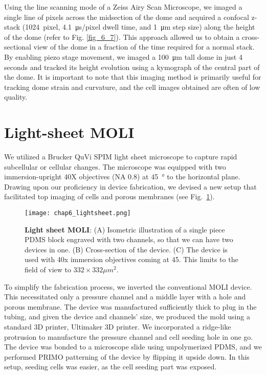 Using the line scanning mode of a Zeiss Airy Scan Microscope, we imaged a single line of pixels across the midsection of the dome and acquired a confocal z-stack (1024~pixel, 4.1~\unit{\us/pixel} dwell time, and 1~\unit{\um} step size) along the height of the dome (refer to Fig. \ref{fig_6_7}). This approach allowed us to obtain a cross-sectional view of the dome in a fraction of the time required for a normal stack. By enabling piezo stage movement, we imaged a 100~\unit{\um} tall dome in just 4 seconds and tracked its height evolution using a kymograph of the central part of the dome. It is important to note that this imaging method is primarily useful for tracking dome strain and curvature, and the cell images obtained are often of low quality.


\hypertarget{light-sheet-moli}{%
\section{Light-sheet MOLI}\label{light-sheet-moli}}

We utilized a Brucker QuVi SPIM light sheet microscope to capture rapid subcellular or cellular changes. The microscope was equipped with two immersion-upright 40X objectives (NA 0.8) at 45~\unit{\degree} to the horizontal plane. Drawing upon our proficiency in device fabrication, we devised a new setup that facilitated top imaging of cells and porous membranes (see Fig.~\ref{fig_6_8}).

\begin{figure}[h!]
	\centering
	\texttt{[image: chap6\_lightsheet.png]}
	\caption{ \textbf{Light sheet MOLI}: (A) Isometric illustration of a single piece PDMS block engraved with two channels, so that we can have two devices in one. (B) Cross-section of the device. (C) The device is used with 40x immersion objectives coming at 45\textdegree. This limits to the field of view to $332\times 332\mu m^2$.
	}\label{fig_6_8}
\end{figure}

To simplify the fabrication process, we inverted the conventional MOLI device. This necessitated only a pressure channel and a middle layer with a hole and porous membrane. The device was manufactured sufficiently thick to plug in the tubing, and given the device and channels' size, we produced the mold using a standard 3D printer, Ultimaker 3D printer. We incorporated a ridge-like protrusion to manufacture the pressure channel and cell seeding hole in one go. The device was bonded to a microscope slide using unpolymerized PDMS, and we performed PRIMO patterning of the device by flipping it upside down. In this setup, seeding cells was easier, as the cell seeding part was exposed.

